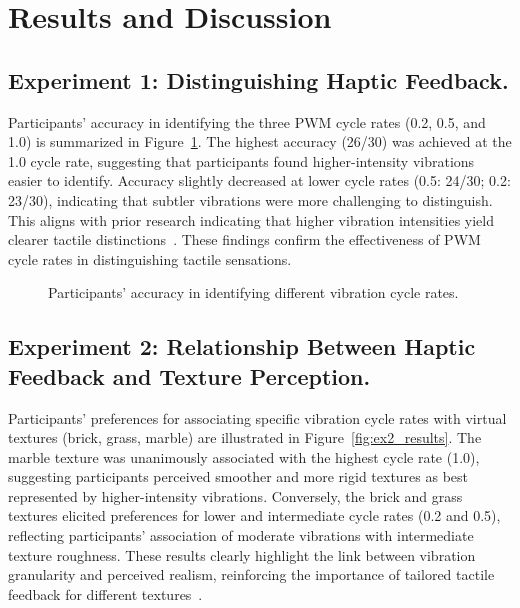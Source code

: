 \documentclass[graybox]{svmult}
\begin{document}
\section{Results and Discussion}

\subsection{Experiment 1: Distinguishing Haptic Feedback.}  

Participants' accuracy in identifying the three PWM cycle rates (0.2, 0.5, and 1.0) is summarized in Figure~\ref{fig:ex1_results}. The highest accuracy (26/30) was achieved at the 1.0 cycle rate, suggesting that participants found higher-intensity vibrations easier to identify. Accuracy slightly decreased at lower cycle rates (0.5: 24/30; 0.2: 23/30), indicating that subtler vibrations were more challenging to distinguish. This aligns with prior research indicating that higher vibration intensities yield clearer tactile distinctions~\cite{strohmeier2017generating,bensmaia2003vibrations}. These findings confirm the effectiveness of PWM cycle rates in distinguishing tactile sensations.

\begin{figure}\centering
	
	\caption{Participants' accuracy in identifying different vibration cycle rates.}\label{fig:ex1_results}
\end{figure}

\subsection{Experiment 2: Relationship Between Haptic Feedback and Texture Perception.}

Participants' preferences for associating specific vibration cycle rates with virtual textures (brick, grass, marble) are illustrated in Figure~\ref{fig:ex2_results}. The marble texture was unanimously associated with the highest cycle rate (1.0), suggesting participants perceived smoother and more rigid textures as best represented by higher-intensity vibrations. Conversely, the brick and grass textures elicited preferences for lower and intermediate cycle rates (0.2 and 0.5), reflecting participants' association of moderate vibrations with intermediate texture roughness. These results clearly highlight the link between vibration granularity and perceived realism, reinforcing the importance of tailored tactile feedback for different textures~\cite{otake2022vibrotactile}.
\end{document}
